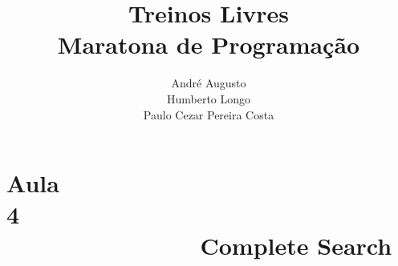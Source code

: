 \documentclass{beamer}
\title[Treinos Livres]{Treinos Livres\\ Maratona de Programação}
\author[{\tiny André, Humberto, Paulo Cezar}]{André Augusto\\ Humberto Longo\\ Paulo Cezar Pereira Costa }
\institute[]{Instituto de Informática\\
           Universidade Federal de Goiás}
\begin{document}
\maketitle

%
%
%

%

\section{Aula 4\ \ \ \ \ \ \ \ \ \ \ \ \ \ \ \ \ \ \ \ \ \ \ \ \ \ \ \ \ \ \ \ \ \ \ \ \ \ \ \ \ \ \ \ \  Complete Search}

\end{document}
